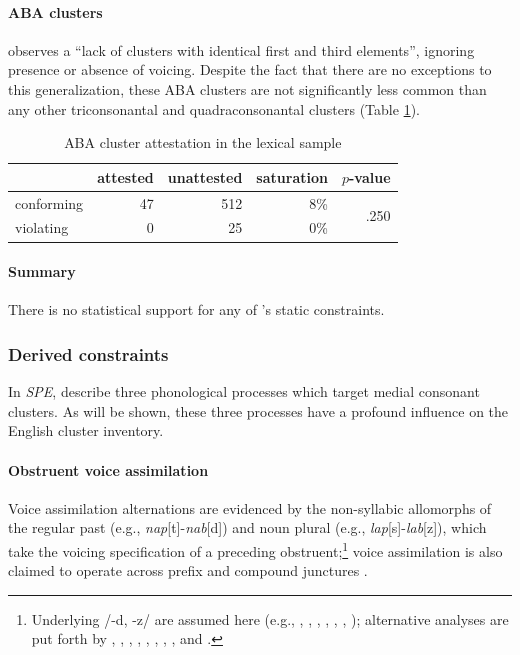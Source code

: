 \paragraph{ABA clusters} 
\citet[176]{Pierrehumbert1994} observes a ``lack of clusters with identical first and third elements'', ignoring presence or absence of voicing. 
Despite the fact that there are no exceptions to this generalization, these \textsc{ABA} clusters are not significantly less common than any other triconsonantal and quadraconsonantal clusters (Table \ref{abatab}).

\begin{table}
\centering
\begin{tabular}{l rrrr}
\toprule
           & attested & unattested & saturation & $p$-value \\
\midrule
conforming & 47       & 512        &  8\%       & \multirow{2}{*}{.250} \\
violating  &  0       &  25        &  0\%       \\
\bottomrule
\end{tabular}
\caption{ABA cluster attestation in the lexical sample}
\label{abatab}
\end{table}

\paragraph{Summary} 
There is no statistical support for any of \citeauthor{Pierrehumbert1994}'s static constraints.

\subsubsection{Derived constraints}

In \emph{SPE}, \citet{SPE} describe three phonological processes which target medial consonant clusters. 
As will be shown, these three processes have a profound influence on the English cluster inventory.

\paragraph{Obstruent voice assimilation}
\label{ova}

Voice assimilation alternations are evidenced by the non-syllabic allomorphs of the regular past (e.g., \emph{nap}[t]-\emph{nab}[d]) and noun plural (e.g., \emph{lap}[s]-\emph{lab}[z]), which take the voicing specification of a preceding obstruent;\footnote{
    Underlying /-d, -z/ are assumed here (e.g., \citealt{Anderson1973a}, \citealt[284f.]{Bakovic2005b}, \citealt{Basboll1972}, \citealt[210]{SPE}, \citealt[282]{Hockett1958}, \citealt[102]{Pinker1988}, \citealt{Shibatani1972}); alternative analyses are put forth by \citet[210f.]{LANGUAGE}, \citet[135]{Borowsky1986}, \citet{Hoard1971}, \citet{Kiparsky1985}, \citet{Lightner1970}, \citet{Luelsdorff1969}, \citet{Miner1975}, \citet[426]{Nida1948}, and \citet{Zwicky1975}.} 
voice assimilation is also claimed to operate across prefix and compound junctures \citep{Davidsen-Nielsen1974}.

